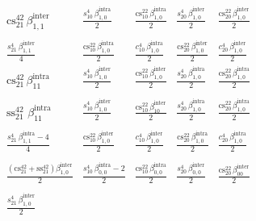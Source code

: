 \documentclass[aps,prb,onecolumn,nofootinbib,citeautoscript,10pt]{revtex4-2}
\begin{document}
{\begin{align*}
\begin{matrix}
 \text{cs}_{21}^{42} \,\beta_{1,1}^{\text{inter}} 
   & \frac{ s_{10}^4 \, \beta_{1,0}^{\text{intra}} }{2}
   & \frac{ \text{cs}_{10}^{22} \, \beta_{1,0}^{\text{intra}} }{2}
   & \frac{ s_{20}^4 \, \beta_{1,0}^{\text{inter}} }{2}
   & \frac{ \text{cs}_{20}^{22} \, \beta_{1,0}^{\text{inter}} }{2}\\ \\
\frac{s_{21}^4 \, \beta_{1,1}^{\text{inter}} }{4} 
   & \frac{ \text{cs}_{10}^{22} \, \beta_{1,0}^{\text{intra}} }{2}
   & \frac{  c_{10}^4 \, \beta_{1,0}^{\text{intra}} }{2}
   & \frac{  \text{cs}_{20}^{22}\, \beta_{1,0}^{\text{inter}} }{2}
   & \frac{ c_{20}^4 \, \beta_{1,0}^{\text{inter}} }{2}\\
\text{cs}_{21}^{42} \,\beta_{11}^{\text{intra}}
    & \frac{  s_{10}^4 \, \beta_{1,0}^{\text{inter}} }{2}
    & \frac{  \text{cs}_{10}^{22} \, \beta_{1,0}^{\text{inter}} }{2}
   & \frac{  s_{20}^4 \, \beta_{1,0}^{\text{intra}} }{2}
   & \frac{ \text{cs}_{20}^{22} \, \beta_{1,0}^{\text{intra}} }{2} \\ \\
  \text{ss}_{21}^{42} \,\, \beta_{11}^{\text{intra}} 
   & \frac{ s_{10}^4 \, \beta_{1,0}^{\text{inter}} }{2} 
   & \frac{ \text{cs}_{10}^{22} \, \beta_{10}^{\text{inter}}}{2} 
   & \frac{ s_{20}^4 \, \beta_{1,0}^{\text{intra}} }{2} 
   & \frac{ \text{cs}_{20}^{22} \, \beta_{1,0}^{\text{intra}} }{2} \\  \\
  \frac{  s_{21}^4 \, \beta_{1,1}^{\text{intra}} -4}  {4} 
   & \frac{\text{cs}_{10}^{22} \, \beta_{1,0}^{\text{inter}} }{2} 
   & \frac{ c_{10}^4 \, \beta_{1,0}^{\text{inter}} }{2} 
   & \frac{ \text{cs}_{20}^{22} \, \beta_{1,0}^{\text{intra}} }{2} 
   & \frac{ c_{20}^4 \, \beta_{1,0}^{\text{intra}} }{2} \\ \\
 \frac{  \left(\text{cs}_{21}^{42}+\text{ss}_{21}^{42} \right)  \beta_{1,0}^{\text{inter}} }{2} 
   & \frac{  s_{10}^4 \, \beta_{0,0}^{\text{intra}} -2} {2}
   & \frac{  \text{cs}_{10}^{22} \, \beta_{0,0}^{\text{intra}} }{2} 
   & \frac{ s_{20}^4 \, \beta_{0,0}^{\text{inter}} }{2} 
   & \frac{  \text{cs}_{20}^{22} \, \beta_{00}^{\text{inter}}}{2}  \\ \\
 \frac{ s_{21}^4 \, \beta_{1,0}^{\text{inter}} }{2} 

\end{matrix}
\end{align*}}
\end{document}
